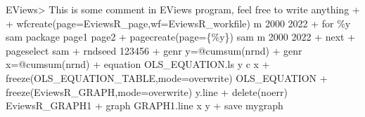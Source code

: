 \documentclass[
]{article}
\newenvironment{Shaded}{\begin{snugshade}}{\end{snugshade}}
\newcommand{\AttributeTok}[1]{\textcolor[rgb]{0.77,0.63,0.00}{#1}}
\newcommand{\DecValTok}[1]{\textcolor[rgb]{0.00,0.00,0.81}{#1}}
\newcommand{\FunctionTok}[1]{\textcolor[rgb]{0.00,0.00,0.00}{#1}}
\newcommand{\NormalTok}[1]{#1}
\newcommand{\SpecialCharTok}[1]{\textcolor[rgb]{0.00,0.00,0.00}{#1}}
\newcommand{\StringTok}[1]{\textcolor[rgb]{0.31,0.60,0.02}{#1}}
\begin{document}
\begin{Shaded}
\end{Shaded}

\begin{Shaded}
\begin{Highlighting}[]
\NormalTok{EViews\textgreater{} \textquotesingle{}This is some comment in EViews program, feel free to write anything}
\NormalTok{+ }
\NormalTok{+ wfcreate(page=EviewsR\_page,wf=EviewsR\_workfile) m 2000 2022}
\NormalTok{+ for \%y sam package page1 page2}
\NormalTok{+ pagecreate(page=\{\%y\}) sam m 2000 2022}
\NormalTok{+ next}
\NormalTok{+ pageselect sam}
\NormalTok{+ rndseed 123456}
\NormalTok{+ genr y=@cumsum(nrnd)}
\NormalTok{+ genr x=@cumsum(nrnd)}
\NormalTok{+ equation OLS\_EQUATION.ls y c x}
\NormalTok{+ freeze(OLS\_EQUATION\_TABLE,mode=overwrite) OLS\_EQUATION}
\NormalTok{+ freeze(EviewsR\_GRAPH,mode=overwrite) y.line}
\NormalTok{+ delete(noerr) EviewsR\_GRAPH1}
\NormalTok{+ graph GRAPH1.line x y}
\NormalTok{+ save mygraph}
\end{Highlighting}
\end{Shaded}
\end{document}
